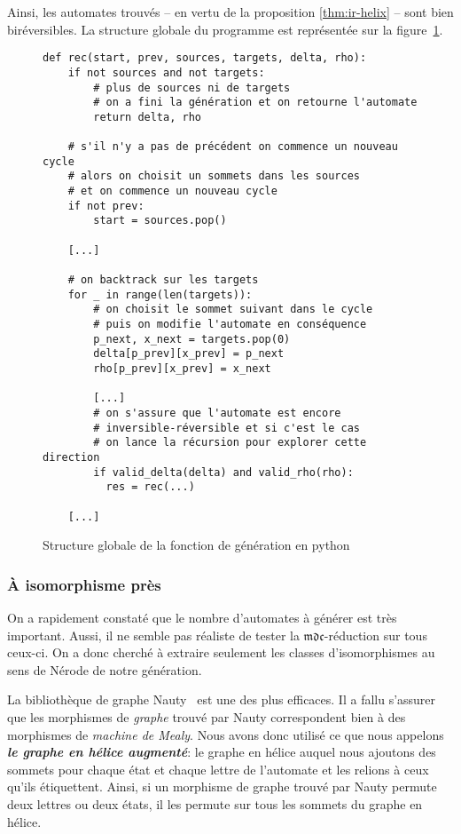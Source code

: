 \documentclass[11pt,a4paper]{article}
\begin{document}
Ainsi, les automates trouvés -- en vertu de la proposition \ref{thm:ir-helix} -- sont bien biréversibles. La structure globale du programme est représentée sur la figure~\ref{fig:gen-pseudo-code}.

\begin{figure}[!ht]
\begin{verbatim}
def rec(start, prev, sources, targets, delta, rho):
    if not sources and not targets:
        # plus de sources ni de targets
        # on a fini la génération et on retourne l'automate
        return delta, rho

    # s'il n'y a pas de précédent on commence un nouveau cycle
    # alors on choisit un sommets dans les sources
    # et on commence un nouveau cycle
    if not prev:
        start = sources.pop()

    [...]

    # on backtrack sur les targets
    for _ in range(len(targets)):
        # on choisit le sommet suivant dans le cycle
        # puis on modifie l'automate en conséquence
        p_next, x_next = targets.pop(0)
        delta[p_prev][x_prev] = p_next
        rho[p_prev][x_prev] = x_next

        [...]
        # on s'assure que l'automate est encore
        # inversible-réversible et si c'est le cas
        # on lance la récursion pour explorer cette direction
        if valid_delta(delta) and valid_rho(rho):
          res = rec(...)

    [...]

\end{verbatim}
  \caption{Structure globale de la fonction de génération en python\label{fig:gen-pseudo-code}}
\end{figure}

\subsubsection*{À isomorphisme près}

On a rapidement constaté que le nombre d'automates à générer est très important. Aussi, il ne semble pas réaliste de tester la $\mathfrak{mdc}$-réduction sur tous ceux-ci. On a donc cherché à extraire seulement les classes d'isomorphismes au sens de Nérode de notre génération.

La bibliothèque de graphe \textrm{Nauty}~\cite{Nauty} est une des plus efficaces. Il a fallu s'assurer que les morphismes de \textit{graphe} trouvé par \textrm{Nauty} correspondent bien à des morphismes de \textit{machine de Mealy}. Nous avons donc utilisé ce que nous appelons \textit{\textbf{le graphe en hélice augmenté}}: le graphe en hélice auquel nous ajoutons des sommets pour chaque état et chaque lettre de l'automate et les relions à ceux qu'ils étiquettent. Ainsi, si un morphisme de graphe trouvé par Nauty permute deux lettres ou deux états, il les permute sur tous les sommets du graphe en hélice.
\end{document}
